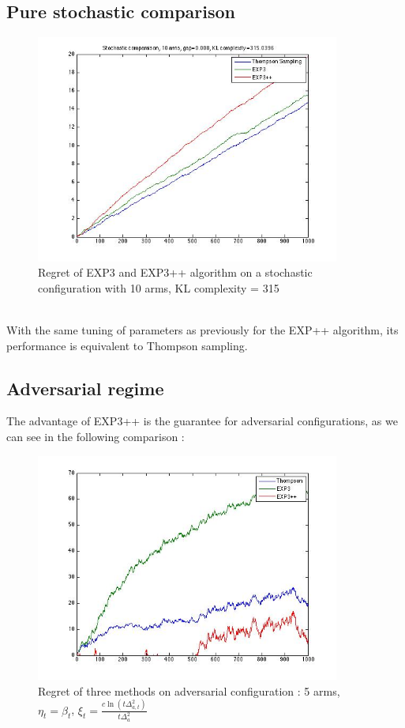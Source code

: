 \documentclass[11pt]{article}
\begin{document}
\subsection*{Pure stochastic comparison}
\begin{figure}[!h]
	\begin{minipage}[c]{0.5 \linewidth}
		\centering
		\captionsetup{justification=centering,margin=1cm}
		\includegraphics[width=10cm]{stochasticComparaison.jpg}
		\caption{Regret of EXP3 and EXP3++ algorithm on a stochastic configuration with 10 arms, KL complexity = 315}
	\end{minipage} \hfill
\end{figure}~\\
With the same tuning of parameters as previously for the EXP++ algorithm, its performance is equivalent to Thompson sampling.
\subsection*{Adversarial regime}
The advantage of EXP3++ is the guarantee for adversarial configurations, as we can see in the following comparison :
\begin{figure}[!h]
	\begin{minipage}[c]{0.5 \linewidth}
		\centering
		\captionsetup{justification=centering,margin=1cm}
		\includegraphics[width=10cm]{compAdversarial.jpg}
		\caption{Regret of three methods on adversarial configuration : 5 arms, $\eta_{t}=\beta_{t}$, $\xi_{t}=\frac{c\ln(t\Delta_{a,t}^{2})}{t\Delta_{a}^{2}}$}
	\end{minipage} \hfill
\end{figure}~\\
\end{document}
